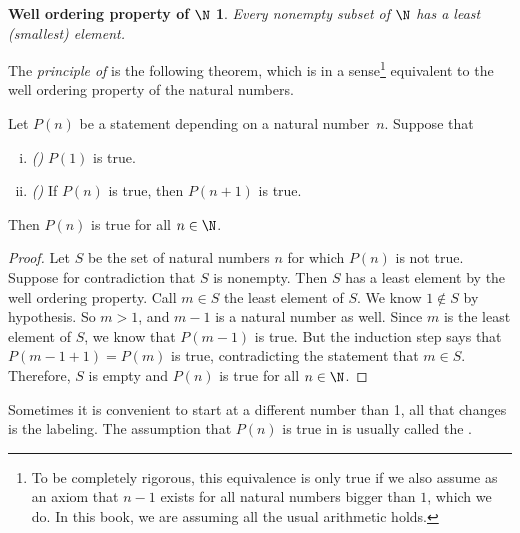 \theoremstyle{plain}
\newtheorem*{wellordprop}{Well ordering property of $\N$}
\hypertarget{wop:link}{}%
\begin{wellordprop}
Every nonempty subset of $\N$ has a least (smallest) element.
\end{wellordprop}

The \emph{principle of } is
the following theorem, which is in a sense\footnote{To be completely
rigorous, this equivalence is only true if we
also assume as an axiom that $n-1$ exists for all natural numbers bigger than $1$, which we
do.  In this book, we are assuming all the usual arithmetic holds.}
equivalent to the well ordering property of the natural numbers.

\begin{thm} \label{induction:thm}
Let $P(n)$ be a statement depending on a natural number~$n$.  Suppose that
\begin{enumerate}[(i)]
\item \emph{()} $P(1)$ is true.
\item \emph{()} If $P(n)$ is true, then $P(n+1)$ is true.
\end{enumerate}
Then $P(n)$ is true for all $n \in \N$.
\end{thm}

\begin{proof}
Let $S$ be the set of natural numbers $n$ for which $P(n)$ is
not true.  Suppose for contradiction that
$S$ is nonempty.  Then $S$ has a least element by the well ordering
property.  Call $m \in S$ the least element of $S$.  We know $1 \notin
S$ by hypothesis.  So $m > 1$, and $m-1$ is a natural number as well.
Since $m$ is the least element of $S$, we know that $P(m-1)$ is true.
But the induction step says that $P(m-1+1) = P(m)$ is true, 
contradicting the statement that $m \in S$.  Therefore, $S$ is empty and 
$P(n)$ is true for all $n \in \N$.
\end{proof}

Sometimes it is convenient to start at a different number than 1,
all that changes is the labeling.  The assumption that
$P(n)$ is true in 
is usually called the \emph{}.

